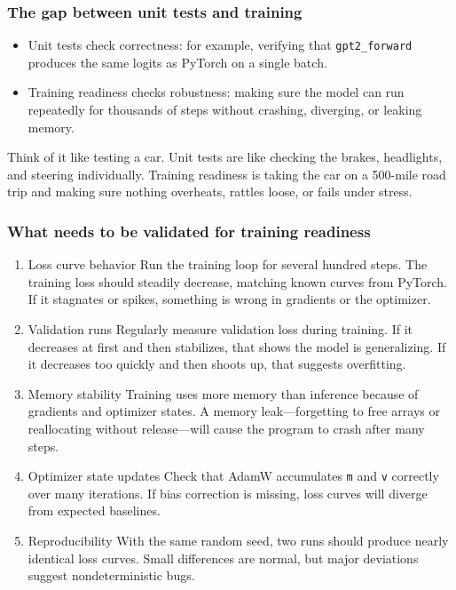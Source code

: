 \documentclass[
  letterpaper,
  DIV=11,
  numbers=noendperiod]{scrreprt}
\providecommand{\tightlist}{%
  \setlength{\itemsep}{0pt}\setlength{\parskip}{0pt}}
\begin{document}
\subsubsection{The gap between unit tests and
training}\label{the-gap-between-unit-tests-and-training}

\begin{itemize}
\tightlist
\item
  Unit tests check correctness: for example, verifying that
  \texttt{gpt2\_forward} produces the same logits as PyTorch on a single
  batch.
\item
  Training readiness checks robustness: making sure the model can run
  repeatedly for thousands of steps without crashing, diverging, or
  leaking memory.
\end{itemize}

Think of it like testing a car. Unit tests are like checking the brakes,
headlights, and steering individually. Training readiness is taking the
car on a 500-mile road trip and making sure nothing overheats, rattles
loose, or fails under stress.

\subsubsection{What needs to be validated for training
readiness}\label{what-needs-to-be-validated-for-training-readiness}

\begin{enumerate}
\def\labelenumi{\arabic{enumi}.}
\item
  Loss curve behavior Run the training loop for several hundred steps.
  The training loss should steadily decrease, matching known curves from
  PyTorch. If it stagnates or spikes, something is wrong in gradients or
  the optimizer.
\item
  Validation runs Regularly measure validation loss during training. If
  it decreases at first and then stabilizes, that shows the model is
  generalizing. If it decreases too quickly and then shoots up, that
  suggests overfitting.
\item
  Memory stability Training uses more memory than inference because of
  gradients and optimizer states. A memory leak---forgetting to free
  arrays or reallocating without release---will cause the program to
  crash after many steps.
\item
  Optimizer state updates Check that AdamW accumulates \texttt{m} and
  \texttt{v} correctly over many iterations. If bias correction is
  missing, loss curves will diverge from expected baselines.
\item
  Reproducibility With the same random seed, two runs should produce
  nearly identical loss curves. Small differences are normal, but major
  deviations suggest nondeterministic bugs.
\end{enumerate}
\end{document}
